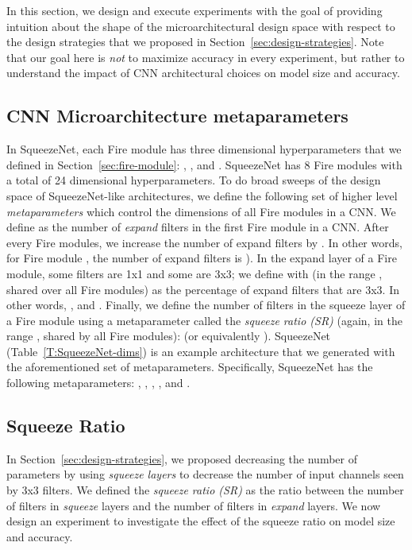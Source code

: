 \documentclass{article} \usepackage{iclr2017_conference,times}
\def\vsp{\vspace{-0.15in}}
\begin{document}
In this section, we design and execute experiments with the goal of providing intuition about the shape of the microarchitectural design space with respect to the design strategies that we proposed in Section~\ref{sec:design-strategies}.
Note that our goal here is {\em not} to maximize accuracy in every experiment, but rather to understand the impact of CNN architectural choices on model size and accuracy.

\subsection{CNN Microarchitecture metaparameters}
\label{sec:metaparameters}
\vsp

In SqueezeNet, each Fire module has three dimensional hyperparameters that we defined in Section~\ref{sec:fire-module}: , , and . 
SqueezeNet has 8 Fire modules with a total of 24 dimensional hyperparameters.
To do broad sweeps of the design space of SqueezeNet-like architectures, we define the following set of higher level {\em metaparameters} which control the dimensions of all Fire modules in a CNN.
We define  as the number of {\em expand} filters in the first Fire module in a CNN.
After every  Fire modules, we increase the number of expand filters by .
In other words, for Fire module , the number of expand filters is ).
In the expand layer of a Fire module, some filters are 1x1 and some are 3x3; we define  with  (in the range , shared over all Fire modules) as the percentage of expand filters that are 3x3.
In other words, , and . 
Finally, we define the number of filters in the squeeze layer of a Fire module using a metaparameter called the {\em squeeze ratio (SR)} (again, in the range , shared by all Fire modules):  (or equivalently ).
SqueezeNet (Table~\ref{T:SqueezeNet-dims}) is an example architecture that we generated with the aforementioned set of metaparameters.
Specifically, SqueezeNet has the following metaparameters: , , , , and .

\subsection{Squeeze Ratio}
\label{sec:SR}
\vsp

In Section~\ref{sec:design-strategies}, we proposed decreasing the number of parameters by using {\em squeeze layers} to decrease the number of input channels seen by 3x3 filters.
We defined the {\em squeeze ratio (SR)} as the ratio between the number of filters in {\em squeeze} layers and the number of filters in {\em expand} layers.
We now design an experiment to investigate the effect of the squeeze ratio on model size and accuracy.
\end{document}
